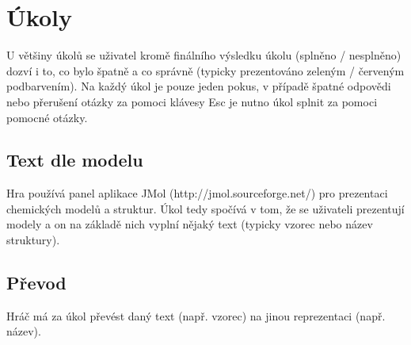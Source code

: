 \documentclass[a4paper,12pt]{article}
\begin{document}
\section{Úkoly}
U většiny úkolů se uživatel kromě finálního výsledku úkolu (splněno / nesplněno) dozví i to, co bylo špatně a co správně (typicky prezentováno zeleným / červeným podbarvením). Na každý úkol je pouze jeden pokus, v případě špatné odpovědi nebo přerušení otázky za pomoci klávesy Esc je nutno úkol splnit za pomoci pomocné otázky.
\subsection{Text dle modelu}
Hra používá panel aplikace JMol (http://jmol.sourceforge.net/) pro prezentaci chemických modelů a struktur. Úkol tedy spočívá v tom, že se uživateli prezentují modely a on na základě nich vyplní nějaký text (typicky vzorec nebo název struktury).
\begin{figure}[H]
\end{figure}
\subsection{Převod}
Hráč má za úkol převést daný text (např. vzorec) na jinou reprezentaci (např. název).
\begin{figure}[H]
\end{figure}
\end{document}
